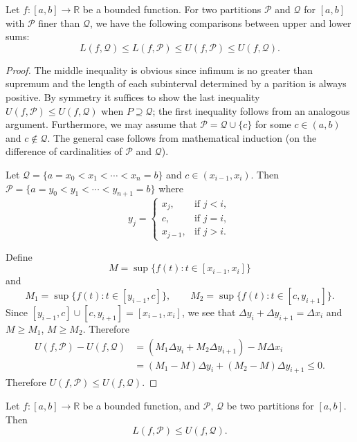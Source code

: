 \begin{thm}
  \label{thm:refine}
  Let $f : [a,b] \to \mathbb{R}$ be a bounded function.
  For two partitions $\mathcal{P}$ and $\mathcal{Q}$ for $[a,b]$ with $\mathcal{P}$ finer than $\mathcal{Q}$, we have the following comparisons between upper and lower sums:
  \[
    L(f,\mathcal{Q}) \leqslant L(f,\mathcal{P}) \leqslant U(f,\mathcal{P}) \leqslant U(f,\mathcal{Q}).
  \]
\end{thm}

\begin{proof}
  The middle inequality is obvious since infimum is no greater than supremum and the length of each subinterval determined by a parition is always positive.
  By symmetry it suffices to show the last inequality $U(f,\mathcal{P}) \leqslant U(f,\mathcal{Q})$ when $P \supseteq \mathcal{Q}$; the first inequality follows from an analogous argument.
  Furthermore, we may assume that $\mathcal{P} = \mathcal{Q} \cup \{ c \}$ for some $c \in (a,b)$ and $c \notin \mathcal{Q}$.
  The general case follows from mathematical induction (on the difference of cardinalities of $\mathcal{P}$ and $\mathcal{Q}$).
  
  Let $\mathcal{Q} = \{ a = x_0 < x_1 < \cdots < x_n = b \}$ and $c \in (x_{i-1}, x_i)$.
  Then $\mathcal{P} = \{ a = y_0 < y_1 < \cdots < y_{n+1} = b \}$ where
  \[
    y_j =
    \begin{cases}
      x_j, & \text{if $j < i$}, \\
      c,   & \text{if $j = i$}, \\
      x_{j-1}, & \text{if $j > i$}.
    \end{cases}
  \]

  Define 
  \[
    M = \sup \{ f(t) \colon t \in [x_{i-1}, x_i] \}
  \]
  and
  \[
    M_1 = \sup \{ f(t) \colon t \in [y_{i-1},c] \}, \qquad
    M_2 = \sup \{ f(t) \colon t \in [c, y_{i+1}] \}.
  \]
  Since $[y_{i-1},c] \cup [c, y_{i+1}] = [x_{i-1},x_i]$, we see that $\Delta y_i + \Delta y_{i+1} = \Delta x_i$ and $M \geqslant M_1$, $M \geqslant M_2$.
  Therefore
  \begin{align*}
    U(f,\mathcal{P}) - U(f,\mathcal{Q}) &= (M_1 \Delta y_i + M_2 \Delta y_{i+1}) - M \Delta x_i \\
    &= (M_1 - M) \Delta y_i + (M_2 - M) \Delta y_{i+1} \leqslant 0.
  \end{align*}
  Therefore $U(f,\mathcal{P}) \leqslant U(f,\mathcal{Q})$. 
\end{proof}

\begin{cor}
  Let $f : [a,b] \to \mathbb{R}$ be a bounded function, and $\mathcal{P}$, $\mathcal{Q}$ be two partitions for $[a,b]$.
  Then
  \[
    L(f,\mathcal{P}) \leqslant U(f,\mathcal{Q}).
  \]
\end{cor}

